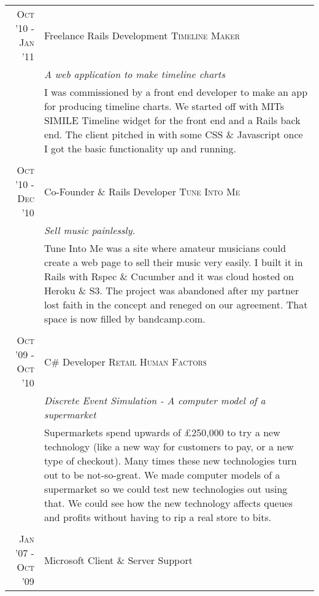 \documentclass[a4paper,11pt]{article}
\begin{document}
\begin{tabular}{r|p{11.2cm}}
  \textsc{Oct '10 - Jan '11} & Freelance Rails Development \textsc{Timeline Maker} \\
                             &\emph{A web application to make timeline charts}\\
                             &\footnotesize{I was commissioned by a front end developer to make an app for
  producing timeline charts. We started off with MITs SIMILE Timeline widget for the front end and a Rails
  back end. The client pitched in with some CSS \& Javascript once I got the basic functionality up and
  running. }
  \\\multicolumn{2}{c}{} \\
  \textsc{Oct '10 - Dec '10} & Co-Founder \& Rails Developer \textsc{Tune Into Me} \\
                             &\emph{Sell music painlessly.}\\
                             &\footnotesize{Tune Into Me was a site where amateur musicians could create a web
  page to sell their music very easily. I built it in Rails with Rspec \& Cucumber and it was cloud hosted
  on Heroku \& S3. The project was abandoned after my partner lost faith in the concept and reneged on
  our agreement. That space is now filled by bandcamp.com.}
  \\\multicolumn{2}{c}{} \\
  \textsc{Oct '09 - Oct '10} & C\# Developer \textsc{Retail Human Factors} \\
                             &\emph{Discrete Event Simulation - A computer model of a supermarket}\\
                             &\footnotesize{Supermarkets spend upwards of \pounds250,000 to try a
  new technology (like a new way for customers to pay, or a new type of checkout). Many times these
  new technologies turn out to be not-so-great. We made computer models of a supermarket so we could
  test new technologies out using that. We could see how the new technology affects queues and profits
  without having to rip a real store to bits.}
  \\\multicolumn{2}{c}{} \\
  \textsc{Jan '07 - Oct '09} & Microsoft Client \& Server Support
\end{tabular}
\end{document}
